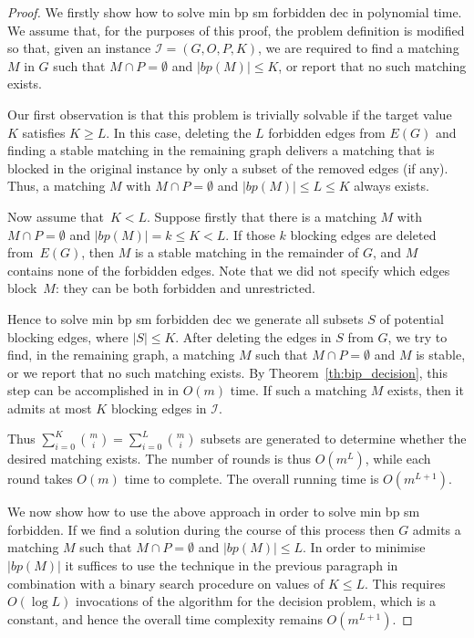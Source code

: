 \documentclass[preprint,12pt]{elsarticle}
\begin{document}
\begin{proof} We firstly show how to solve {\sc min bp sm forbidden dec} in polynomial time.  We assume that, for the purposes of this proof, the problem definition is modified so that, given an instance $\mathcal{I} = (G, O, P, K)$, we are required to find a matching $M$ in $G$ such that $M\cap P=\emptyset$ and $|bp(M)|\leq K$, or report that no such matching exists.

Our first observation is that this problem is trivially solvable if the target value $K$ satisfies $K \geq L$. In this case, deleting the $L$ forbidden edges from $E(G)$ and finding a stable matching in the remaining graph delivers a matching that is blocked in the original instance by only a subset of the removed edges (if any). Thus, a matching $M$ with $M \cap P = \emptyset$ and $|bp(M)|\leq L\leq K$ always exists.

Now assume that~$K<L$. Suppose firstly that there is a matching $M$ with $M \cap P = \emptyset$ and $|bp(M)| = k \leq K < L$. If those $k$ blocking edges are deleted from~$E(G)$, then $M$ is a stable matching in the remainder of $G$, and $M$ contains none of the forbidden edges. Note that we did not specify which edges block~$M$: they can be both forbidden and unrestricted. 

Hence to solve {\sc min bp sm forbidden dec} we generate all subsets $S$ of potential blocking edges, where $|S|\leq K$.  After deleting the edges in $S$ from $G$, we try to find, in the remaining graph, a matching $M$ such that $M\cap P=\emptyset$ and $M$ is stable, or we report that no such matching exists.  By Theorem~\ref{th:bip_decision}, this step can be accomplished in in $O(m)$ time. If such a matching $M$ exists, then it admits at most $K$ blocking edges in $\mathcal I$.   

Thus $\sum_{i = 0}^{K}{m \choose i}=\sum_{i = 0}^{L}{m \choose i}$ subsets are generated to determine whether the desired matching exists.  The number of rounds is thus $O(m^L)$, while each round takes $O(m)$ time to complete.  The overall running time is $O(m^{L+1})$.

We now show how to use the above approach in order to solve {\sc min bp sm forbidden}.  If we find a solution during the course of this process then $G$ admits a matching $M$ such that $M\cap P=\emptyset$ and $|bp(M)|\leq L$.  In order to minimise $|bp(M)|$ it suffices to use the technique in the previous paragraph in combination with a binary search procedure on values of $K\leq L$.  This requires $O(\log L)$ invocations of the algorithm for the decision problem, which is a constant, and hence the overall time complexity remains $O(m^{L+1})$.
\end{proof}
\end{document}
